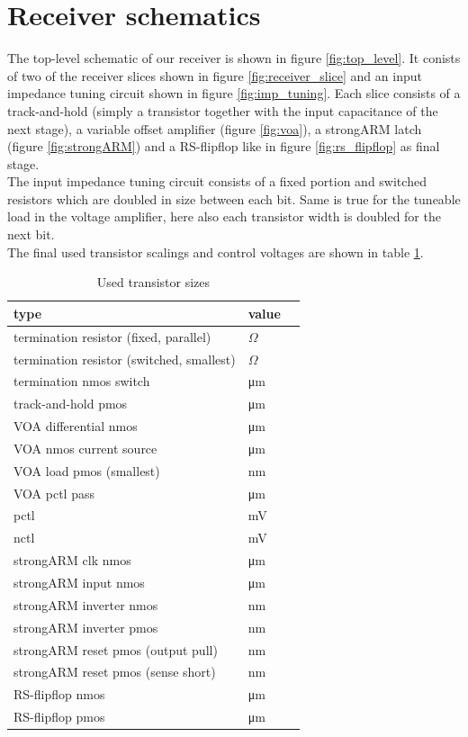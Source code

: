 \section{Receiver schematics}
\label{sec:rx_schematics}

The top-level schematic of our receiver is shown in figure \ref{fig:top_level}. It conists of two of the receiver slices shown in figure \ref{fig:receiver_slice} and an input impedance tuning circuit shown in figure \ref{fig:imp_tuning}. Each slice consists of a track-and-hold (simply a transistor together with the input capacitance of the next stage), a variable offset amplifier (figure \ref{fig:voa}), a strongARM latch (figure \ref{fig:strongARM}) and a RS-flipflop like in figure \ref{fig:rs_flipflop} as final stage.\\
The input impedance tuning circuit consists of a fixed portion and switched resistors which are doubled in size between each bit. Same is true for the tuneable load in the voltage amplifier, here also each transistor width is doubled for the next bit.\\
The final used transistor scalings and control voltages are shown in table \ref{tab:scaling}.

\begin{table}[H]
  \centering
  \begin{tabular}{l|l|l}
    type & value\\
    \hline
    termination resistor (fixed, parallel) & \unit[131]{$\Omega$}\\
    termination resistor (switched, smallest) & \unit[220]{$\Omega$}\\
    termination nmos switch & \unit[20]{\um}\\
    \hline
    track-and-hold pmos & \unit[20]{\um}\\
    \hline
    VOA differential nmos & \unit[2]{\um}\\
    VOA nmos current source & \unit[16]{\um}\\
    VOA load pmos (smallest) & \unit[400]{nm}\\
    VOA pctl pass & \unit[10]{\um}\\
    pctl & \unit[757]{mV}\\
    nctl & \unit[320]{mV}\\
    \hline
    strongARM clk nmos & \unit[2]{\um}\\
    strongARM input nmos & \unit[2]{\um}\\
    strongARM inverter nmos & \unit[300]{nm}\\
    strongARM inverter pmos & \unit[600]{nm}\\
    strongARM reset pmos (output pull) & \unit[750]{nm}\\
    strongARM reset pmos (sense short) & \unit[200]{nm}\\
    \hline
    RS-flipflop nmos & \unit[2]{\um}\\
    RS-flipflop pmos & \unit[2]{\um}\\
  \end{tabular}
  \caption{Used transistor sizes}
  \label{tab:scaling}
\end{table}

